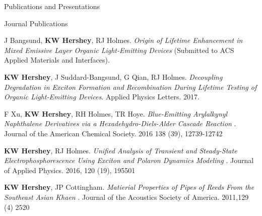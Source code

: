 \documentclass{resume} %
\begin{document}

\begin{rSection}{Publications and Presentations}
\begin{rSubsection}{Journal Publications}{}{}{}
\item J Bangsund, \textbf{KW Hershey}, RJ Holmes. {\em Origin of Lifetime Enhancement in Mixed Emissive Layer Organic Light-Emitting Devices} (Submitted to ACS Applied Materials and Interfaces).
\item  \textbf{KW Hershey}, J Suddard-Bangsund, G Qian, RJ Holmes. {\em Decoupling Degradation in Exciton Formation and Recombination During Lifetime Testing of Organic Light-Emitting Devices}. Applied Physics Letters. 2017.
\item F Xu, \textbf{KW Hershey}, RH Holmes, TR Hoye. {\em Blue-Emitting Arylalkynyl Naphthalene Derivatives via a Hexadehydro-Diels-Alder Cascade Reaction} . Journal of the American Chemical Society. 2016 138 (39), 12739-12742
\item \textbf{KW Hershey}, RJ Holmes. {\em Unified Analysis of Transient and Steady-State Electrophosphorescence Using Exciton and Polaron Dynamics Modeling} . Journal of Applied Physics. 2016, 120 (19), 195501
\item \textbf{KW Hershey}, JP Cottingham. {\em Matierial Properties of Pipes of Reeds From the Southeast Asian Khaen} . Journal of the Acoustics Society of America. 2011,129 (4) 2520

\end{rSubsection}



\end{rSection}
\end{document}
